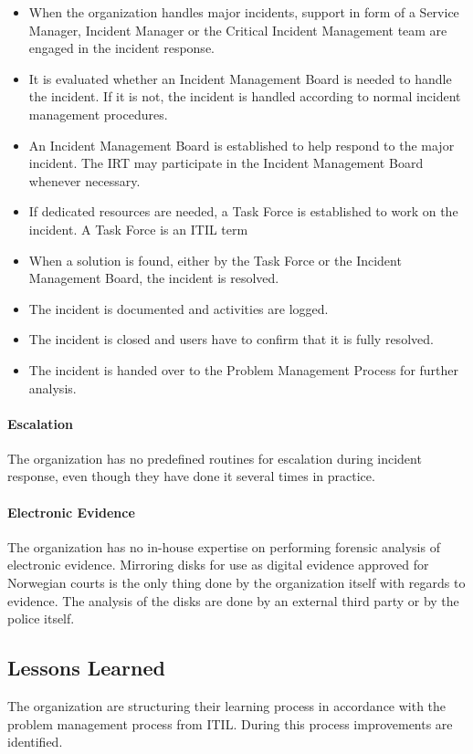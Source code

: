 \begin{itemize}
\item When the organization handles major incidents, support in form of a Service Manager, Incident Manager or the Critical Incident Management team are engaged in the incident response.
\item It is evaluated whether an Incident Management Board is needed to handle the incident. If it is not, the incident is handled according to normal incident management procedures.
\item An Incident Management Board is established to help respond to the major incident. The \ac{IRT} may participate in the Incident Management Board whenever necessary.
\item If dedicated resources are needed, a Task Force is established to work on the incident. A Task Force is an ITIL term
\item When a solution is found, either by the Task Force or the Incident Management Board, the incident is resolved.
\item The incident is documented and activities are logged.
\item The incident is closed and users have to confirm that it is fully resolved.
\item The incident is handed over to the Problem Management Process for further analysis.  
\end{itemize}


\paragraph{Escalation}
The organization has no predefined routines for escalation during incident response, even though they have done it several times in practice.

\paragraph{Electronic Evidence}
The organization has no in-house expertise on performing forensic analysis of electronic evidence. Mirroring disks for use as digital evidence approved for Norwegian courts is the only thing done by the organization itself with regards to evidence. The analysis of the disks are done by an external third party or by the police itself.

\subsection{Lessons Learned}
The organization are structuring their learning process in accordance with the problem management process from ITIL. During this process improvements are identified. 

